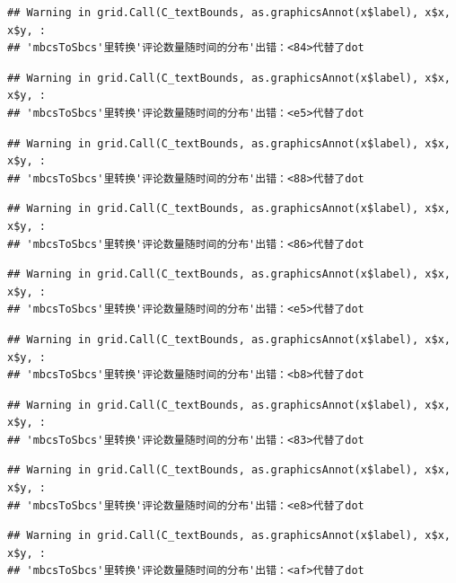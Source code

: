 \documentclass[
]{article}
\begin{document}
\begin{verbatim}
## Warning in grid.Call(C_textBounds, as.graphicsAnnot(x$label), x$x, x$y, :
## 'mbcsToSbcs'里转换'评论数量随时间的分布'出错：<84>代替了dot
\end{verbatim}

\begin{verbatim}
## Warning in grid.Call(C_textBounds, as.graphicsAnnot(x$label), x$x, x$y, :
## 'mbcsToSbcs'里转换'评论数量随时间的分布'出错：<e5>代替了dot
\end{verbatim}

\begin{verbatim}
## Warning in grid.Call(C_textBounds, as.graphicsAnnot(x$label), x$x, x$y, :
## 'mbcsToSbcs'里转换'评论数量随时间的分布'出错：<88>代替了dot
\end{verbatim}

\begin{verbatim}
## Warning in grid.Call(C_textBounds, as.graphicsAnnot(x$label), x$x, x$y, :
## 'mbcsToSbcs'里转换'评论数量随时间的分布'出错：<86>代替了dot
\end{verbatim}

\begin{verbatim}
## Warning in grid.Call(C_textBounds, as.graphicsAnnot(x$label), x$x, x$y, :
## 'mbcsToSbcs'里转换'评论数量随时间的分布'出错：<e5>代替了dot
\end{verbatim}

\begin{verbatim}
## Warning in grid.Call(C_textBounds, as.graphicsAnnot(x$label), x$x, x$y, :
## 'mbcsToSbcs'里转换'评论数量随时间的分布'出错：<b8>代替了dot
\end{verbatim}

\begin{verbatim}
## Warning in grid.Call(C_textBounds, as.graphicsAnnot(x$label), x$x, x$y, :
## 'mbcsToSbcs'里转换'评论数量随时间的分布'出错：<83>代替了dot
\end{verbatim}

\begin{verbatim}
## Warning in grid.Call(C_textBounds, as.graphicsAnnot(x$label), x$x, x$y, :
## 'mbcsToSbcs'里转换'评论数量随时间的分布'出错：<e8>代替了dot
\end{verbatim}

\begin{verbatim}
## Warning in grid.Call(C_textBounds, as.graphicsAnnot(x$label), x$x, x$y, :
## 'mbcsToSbcs'里转换'评论数量随时间的分布'出错：<af>代替了dot
\end{verbatim}
\end{document}
